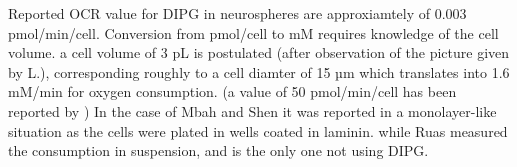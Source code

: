 \documentclass[11pt,a4paper]{article}
\begin{document}
Reported OCR value for DIPG in neurospheres are approxiamtely of 0.003 pmol/min/cell.\cite{Shen2019}\cite{Ruas2018} Conversion from pmol/cell to mM requires knowledge of the cell volume. a cell volume of 3 pL is postulated (after observation of the picture given by L.), corresponding roughly to a cell diamter of 15 µm which translates into 1.6 mM/min for oxygen consumption. (a value of 50 pmol/min/cell has been reported by \cite{Mbah2022}) In the case of Mbah and Shen it was reported in  a monolayer-like situation as the cells were plated in wells coated in laminin. while Ruas measured the consumption in suspension, and is the only one not using DIPG.

\end{document}
